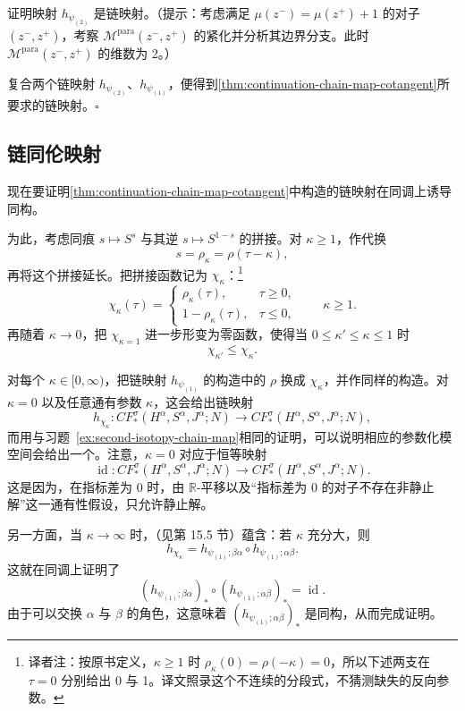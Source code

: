 \begin{exercise}
\label{ex:second-isotopy-chain-map}
证明映射 $h_{\psi_{(2)}}$ 是链映射。（提示：考虑满足 $\mu(z^-)=\mu(z^+)+1$ 的对子 $(z^-,z^+)$，考察 $\mathcal M^{\mathrm{para}}(z^-,z^+)$ 的紧化并分析其边界分支。此时 $\mathcal M^{\mathrm{para}}(z^-,z^+)$ 的维数为 2。）
\end{exercise}

复合两个链映射 $h_{\psi_{(2)}}$、$h_{\psi_{(1)}}$，便得到\cref{thm:continuation-chain-map-cotangent}所要求的链映射。\hfill$\square$

\subsection{链同伦映射}
\label{subsec:chain-homotopy-map}

现在要证明\cref{thm:continuation-chain-map-cotangent}中构造的链映射在同调上诱导同构。

为此，考虑同痕 $s\longmapsto S^s$ 与其逆 $s\longmapsto S^{1-s}$ 的拼接。对 $\kappa\ge1$，作代换
\[
  s=\rho_\kappa=\rho(\tau-\kappa),
\]
再将这个拼接延长。把拼接函数记为 $\chi_\kappa$：\footnote{译者注：按原书定义，$\kappa\ge1$ 时 $\rho_\kappa(0)=\rho(-\kappa)=0$，所以下述两支在 $\tau=0$ 分别给出 0 与 1。译文照录这个不连续的分段式，不猜测缺失的反向参数。}
\[
  \chi_\kappa(\tau)=
  \begin{cases}
    \rho_\kappa(\tau),&\tau\ge0,\\
    1-\rho_\kappa(\tau),&\tau\le0,
  \end{cases}
  \qquad \kappa\ge1.
\]
再随着 $\kappa\to0$，把 $\chi_{\kappa=1}$ 进一步形变为零函数，使得当 $0\le\kappa'\le\kappa\le1$ 时
\[
  \chi_{\kappa'}\le\chi_\kappa.
\]

对每个 $\kappa\in[0,\infty)$，把链映射 $h_{\psi_{(1)}}$ 的构造中的 $\rho$ 换成 $\chi_\kappa$，并作同样的构造。对 $\kappa=0$ 以及任意通有参数 $\kappa$，这会给出链映射
\[
  h_{\chi_\kappa}:
  CF_*^\sigma(H^\alpha,S^\alpha,J^\alpha;N)
  \longrightarrow
  CF_*^\sigma(H^\alpha,S^\alpha,J^\alpha;N),
\]
而用与习题~\ref{ex:second-isotopy-chain-map}相同的证明，可以说明相应的参数化模空间会给出一个\termChainHomotopyMap{}。注意，$\kappa=0$ 对应于恒等映射
\[
  \operatorname{id}:
  CF_*^\sigma(H^\alpha,S^\alpha,J^\alpha;N)
  \longrightarrow
  CF_*^\sigma(H^\alpha,S^\alpha,J^\alpha;N).
\]
这是因为，在指标差为 0 时，由 $\mathbb R$-平移以及“指标差为 0 的对子不存在非静止解”这一通有性假设，只允许静止解。

另一方面，当 $\kappa\to\infty$ 时，\termGluingTheorem{}（见第 15.5 节）蕴含：若 $\kappa$ 充分大，则
\[
  h_{\chi_\kappa}
  =h_{\psi_{(1)};\beta\alpha}\circ h_{\psi_{(1)};\alpha\beta}.
\]
这就在同调上证明了
\[
  (h_{\psi_{(1)};\beta\alpha})_*
  \circ(h_{\psi_{(1)};\alpha\beta})_*
  =\operatorname{id}.
\]
由于可以交换 $\alpha$ 与 $\beta$ 的角色，这意味着 $(h_{\psi_{(1)};\alpha\beta})_*$ 是同构，从而完成证明。

